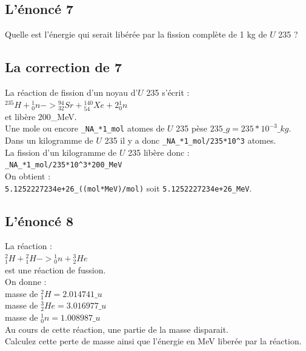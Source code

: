\documentclass[a4paper,11pt]{book}
\begin{document}
\subsection{L'\'enonc\'e 7}
Quelle est l'\'energie qui serait lib\'er\'ee par la fission compl\`ete de 1 kg
 de $U$ 235 ?
\subsection{La correction de 7}
La r\'eaction de fission d'un noyau d'$U$ 235 s'\'ecrit :\\
${}^{235}H+{}_0^1n->{}_{32}^{94}Sr+{}_{54}^{140}Xe+2{}_0^1n$\\
et lib\`ere 200\_MeV.\\
Une mole ou encore  {\tt \_NA\_*1\_mol} atomes de $U$ 235 p\`ese 
$235\_g=235*10^{-3}\_kg$.\\
Dans un kilogramme de $U$ 235 il y a donc {\tt \_NA\_*1\_mol/235*10\verb|^|3}
 atomes.\\
La fission d'un kilogramme de $U$ 235 lib\`ere donc :\\
{\tt \_NA\_*1\_mol/235*10\verb|^|3*200\_MeV}\\
On obtient :\\
{\tt 5.1252227234e+26\_((mol*MeV)/mol)}
soit {\tt 5.1252227234e+26\_MeV}.

\subsection{L'\'enonc\'e 8}
La r\'eaction :\\
${}_1^2H+{}_1^2H->{}_0^1n+{}_2^3He$\\
est une r\'eaction de fussion.\\
On donne :\\
masse de ${}_1^2H =2.014741 \_u$\\
masse de ${}_2^3He=3.016977 \_u$\\
masse de ${}_0^1n=1.008987\_u$\\
Au cours de cette r\'eaction, une partie de la masse disparait.\\
Calculez cette perte de masse ainsi que l'\'energie en MeV liber\'ee par la
r\'eaction.
\end{document}
